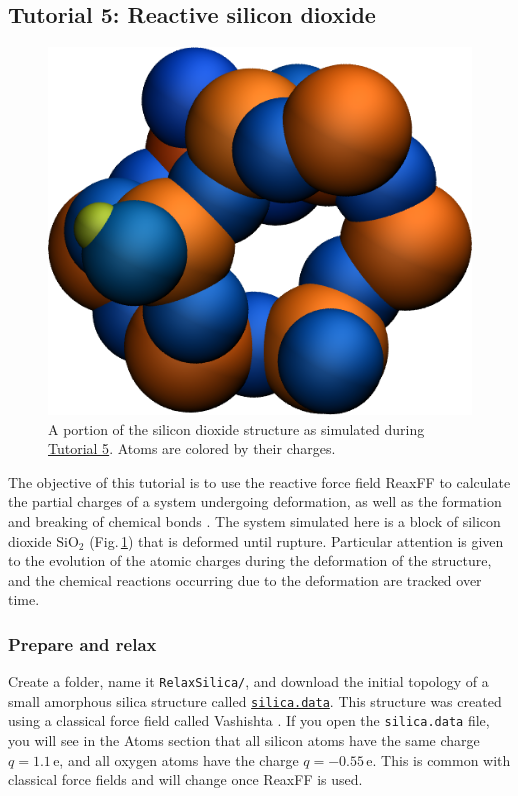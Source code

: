 \documentclass[9pt,tutorial]{livecoms}
\newcommand{\flrcmd}[1]{\textcolor{command}{\texttt{#1}}} %
\newcommand{\flecmd}[1]{\textcolor{command}{\texttt{#1}}} %
\newcommand{\dwlcmd}[1]{\textcolor{download}{\texttt{#1}}} %
\newcommand{\filepath}{https://raw.githubusercontent.com/lammpstutorials/lammpstutorials-article/main/files/}
\begin{document}
\subsection{Tutorial 5: Reactive silicon dioxide}
\label{reactive-silicon-dioxide-label}

\begin{figure}
\centering
\includegraphics[width=0.55\linewidth]{SIO}
\caption{A portion of the silicon dioxide structure as simulated during
\hyperref[reactive-silicon-dioxide-label]{Tutorial 5}. Atoms are colored by their charges.}
\label{fig:SIO}
\end{figure}

\noindent The objective of this tutorial is to use the reactive force field ReaxFF
to calculate the partial charges of a system undergoing deformation, as well as
the formation and breaking of chemical bonds \cite{van2001reaxff, zou2012investigation}.
The system simulated here is a block of silicon dioxide $\text{SiO}_2$ (Fig.\,\ref{fig:SIO})
that is deformed until rupture. Particular attention is given to the evolution of
the atomic charges during the deformation of the structure, and the chemical
reactions occurring due to the deformation are tracked over time.

\subsubsection{Prepare and relax}
Create a folder, name it \flrcmd{RelaxSilica/}, and download the initial topology
of a small amorphous silica structure called
\href{\filepath tutorial5/silica.data}{\dwlcmd{silica.data}}.
This structure was created using a classical force field called
Vashishta \cite{vashishta1990interaction}. If you open the \flecmd{silica.data}
file, you will see in the Atoms section that all silicon atoms have the same
charge $q = 1.1\,\text{e}$, and all oxygen atoms have the charge $q = -0.55\,\text{e}$.
This is common with classical force fields and will change once ReaxFF is used.
\end{document}
